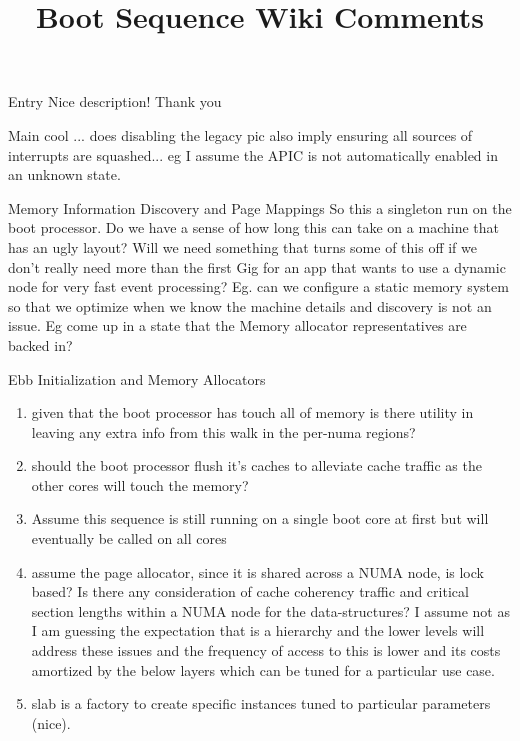 \documentclass[11pt]{article}
\title{Boot Sequence Wiki Comments}
\begin{document}
\maketitle
\begin{description}
    \item{Entry} Nice description!  Thank you
    \item{Main} cool ... does disabling the legacy pic also imply ensuring all 
                sources of interrupts are squashed... eg I assume the APIC is
                not automatically enabled in an unknown state.
    \item{Memory Information Discovery and Page Mappings} So this a singleton run on the boot processor.  Do we have a sense of how long this can take on a machine that has an ugly layout?
    Will we need something that turns some of this off if we don't really need more than 
    the first Gig for an app that wants to use a dynamic node for very fast event processing?
    Eg.  can we configure a static memory system so that we optimize when we know the machine
     details and discovery is not an issue.  Eg come up in a state that the Memory allocator
     representatives are backed in? 
    \item{Ebb Initialization and Memory Allocators}
      \begin{enumerate}
        \item given that the boot processor has touch all of memory is there utility 
              in leaving any extra info from this walk in the per-numa regions?
        \item should the boot processor flush it's caches to alleviate cache traffic as the other cores will touch the memory?
        \item Assume this sequence is still running on a single boot core
              at first but will eventually be called on all cores
        \item assume the page allocator, since it is shared across a NUMA node,
              is lock based?  Is there any consideration of cache coherency traffic 
              and critical section lengths within a NUMA node for the data-structures?
              I assume not as I am guessing the expectation that is a hierarchy and the       
              lower levels will address these issues and the frequency of access to 
              this is lower and its costs amortized by the below layers which can
              be tuned for a particular use case.
        \item slab is a factory to create specific instances tuned to particular parameters  (nice).

\end{enumerate}
\end{description}
\end{document}
